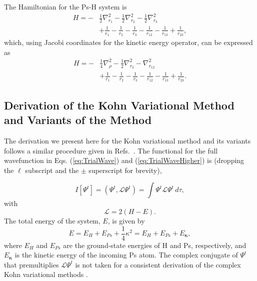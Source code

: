 \documentclass[preprint,showpacs,showkeys,preprintnumbers,amsmath,amssymb,longbibliography,pra,aps]{revtex4-1}
\begin{document}
{%
The Hamiltonian for the Ps-H system is
\begin{align}
H = -&\frac{1}{2} \nabla_{r_1}^2 - \frac{1}{2} \nabla_{r_2}^2 - \frac{1}{2}
  \nabla_{r_3}^2  \nonumber \\
&+ \frac{1}{r_1} - \frac{1}{r_2} - \frac{1}{r_3} - \frac{1}{r_{12}} -
  \frac{1}{r_{13}}+\frac {1}{r_{23}},
\label{eq:Hamiltonian1}
\end{align}
which, using Jacobi coordinates for the kinetic energy operator, can be
expressed as
\begin{align}
H = -&\frac{1}{4} \nabla_{\rho}^2 - \frac{1}{2} \nabla_{r_3}^2 -
  \nabla_{r_{12}}^2  \nonumber \\
&+ \frac{1}{r_1} - \frac{1}{r_2} - \frac{1}{r_3} - \frac{1}{r_{12}} -
  \frac{1}{r_{13}}+\frac{1}{r_{23}}.
\label{eq:Hamiltonian2}
\end{align}


\subsection{Derivation of the Kohn Variational Method and Variants of the Method}
\label{sec:Kohn}
The derivation we present here for the Kohn variational method and its variants
follows a similar procedure given in
Refs.~\cite{Lucchese1989,Cooper2010,Armour1991,VanReethThesis}.
The functional for the full wavefunction in Eqs. (\ref{eq:TrialWave}) and
(\ref{eq:TrialWaveHigher}) is (dropping the $\ell$ subscript and the $\pm$ 
superscript for brevity),

\begin{equation}
I[\Psi^t] = \left(\Psi^t, \mathcal{L} \Psi^t \right) = \int \Psi^t \mathcal{L}
  \Psi^t \,d\tau,
\label{eq:IlDefPsi}
\end{equation}
with
\begin{equation}
\mathcal{L} = 2(H - E).
\label{eq:LDef}
\end{equation}
The total energy of the system, $E$, is given by
\begin{equation}
\label{eq:TotalEnergy}
E = E_H + E_{Ps} + \frac{1}{4}\kappa^2 = E_H + E_{Ps} + E_{\bm \kappa},
\end{equation}
where $E_H$ and $E_{Ps}$ are the ground-state energies of H and Ps, 
respectively,
and $E_{\bm \kappa}$ is the kinetic energy of the incoming Ps atom.
The complex conjugate of $\Psi^t$ that premultiplies $\mathcal{L} \Psi^t$
is not taken for a consistent derivation of the complex Kohn variational
methods \cite{Cooper2010,Lucchese1989}.

}
\end{document}
